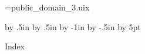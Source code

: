 








\openout\index=public_domain_3.uix










\begingroup
\advance\voffset by .5in
\advance\hoffset by .5in
\advance\hsize by -1in
\advance\vsize by -.5in
\advance\baselineskip by 5pt
\centerline{{\largebx Index}}
\baselineskip

\vfil\eject
\endgroup

\closeout\index

\Copying
\vfil\eject

\bye


